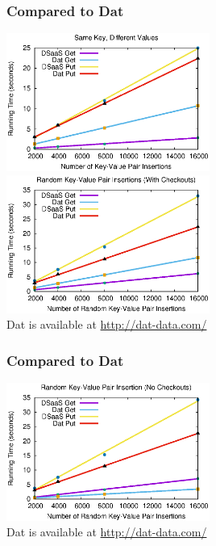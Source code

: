 \begin{frame}[fragile]
	\frametitle{Compared to Dat}
  \begin{center}
  	\includegraphics[width=0.5\textwidth]{images/same_key_diff_versions.eps}
  	\includegraphics[width=0.5\textwidth]{images/kvpair.eps}
    \\
    Dat is available at \url{http://dat-data.com/}
  \end{center}
\end{frame}

\begin{frame}[fragile]
  \frametitle{Compared to Dat}
  \begin{center}
  	\includegraphics[width=0.5\textwidth]{images/samver.eps}
    \\
    Dat is available at \url{http://dat-data.com/}
  \end{center}
\end{frame}